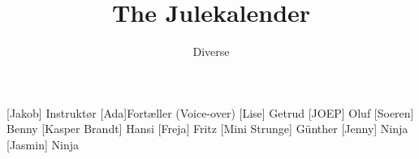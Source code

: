 \documentclass[a4paper,11pt]{article}
\title{The Julekalender}
\author{Diverse}
\begin{document}
\maketitle

\begin{roles}
    [Jakob] Instruktør 
    [Ada]Fortæller (Voice-over)
	[Lise] Getrud
	[JOEP] Oluf
	[Soeren] Benny
	[Kasper Brandt] Hansi
	[Freja] Fritz
	[Mini Strunge] Günther
	[Jenny] Ninja
	[Jasmin] Ninja
\end{roles}


\begin{props}
\end{props}
\end{document}
